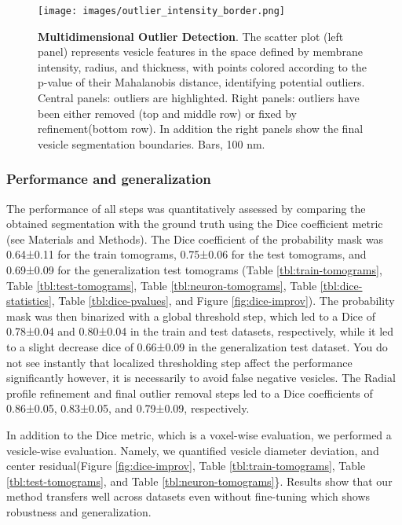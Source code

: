 \begin{figure}
\hypertarget{fig:outlier}{%
\centering
\texttt{[image: images/outlier\_intensity\_border.png]}
\caption{\textbf{Multidimensional Outlier Detection}. The scatter plot (left panel) represents vesicle features in the space defined by membrane intensity, radius, and thickness, with points colored according to the p-value of their Mahalanobis distance, identifying potential outliers. Central panels: outliers are highlighted. Right panels: outliers have been either removed (top and middle row) or fixed by refinement(bottom row). In addition the right panels show the final vesicle segmentation boundaries. Bars, 100 nm.}\label{fig:outlier}
}
\end{figure}

\hypertarget{performance-and-generalization}{%
\subsubsection{Performance and generalization}\label{performance-and-generalization}}

The performance of all steps was quantitatively assessed by comparing the obtained segmentation with the ground truth using the Dice coefficient metric (see Materials and Methods).
The Dice coefficient of the probability mask was 0.64±0.11 for the train tomograms, 0.75±0.06 for the test tomograms, and 0.69±0.09 for the generalization test tomograms (Table \ref{tbl:train-tomograms}, Table \ref{tbl:test-tomograms}, Table \ref{tbl:neuron-tomograms}, Table \ref{tbl:dice-statistics}, Table \ref{tbl:dice-pvalues}, and Figure \ref{fig:dice-improv}).
The probability mask was then binarized with a global threshold step, which led to a Dice of 0.78±0.04 and 0.80±0.04 in the train and test datasets, respectively, while it led to a slight decrease dice of 0.66±0.09 in the generalization test dataset.
You do not see instantly that localized thresholding step affect the performance significantly however, it is necessarily to avoid false negative vesicles.
The Radial profile refinement and final outlier removal steps led to a Dice coefficients of 0.86±0.05, 0.83±0.05, and 0.79±0.09, respectively.

In addition to the Dice metric, which is a voxel-wise evaluation, we performed a vesicle-wise evaluation.
Namely, we quantified vesicle diameter deviation, and center residual(Figure \ref{fig:dice-improv}, Table \ref{tbl:train-tomograms}, Table \ref{tbl:test-tomograms}, and Table \ref{tbl:neuron-tomograms}\}.
Results show that our method transfers well across datasets even without fine-tuning which shows robustness and generalization.

